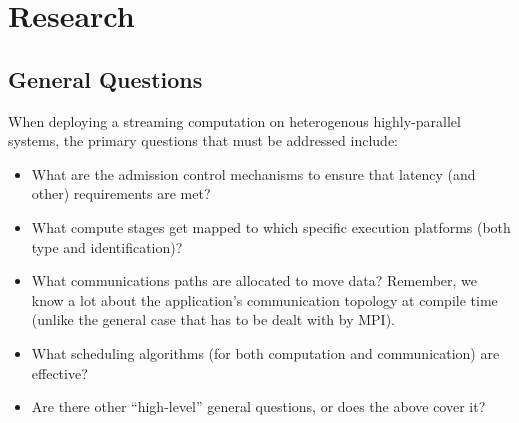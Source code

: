 \section{Research}
\label{sec:research}




\subsection{General Questions}


When deploying a streaming computation on heterogenous highly-parallel systems, the primary questions that must be addressed include:

\begin{itemize}

\item What are the admission control mechanisms to ensure that latency (and other) requirements are met?

\item What compute stages get mapped to which specific execution platforms (both type and identification)?

\item What communications paths are allocated to move data? Remember, we know a lot about the application's communication
topology at compile time (unlike the general case that has to be dealt with by MPI).

\item What scheduling algorithms (for both computation and communication) are effective?

\item Are there other ``high-level'' general questions, or does the above cover it?  

\end{itemize}

